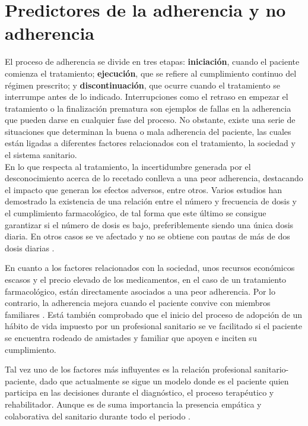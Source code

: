 \section{Predictores de la adherencia y no adherencia}

El proceso de adherencia se divide en tres etapas: \textbf{iniciación}, cuando el paciente comienza el tratamiento; \textbf{ejecución}, que se refiere al cumplimiento continuo del régimen prescrito; y \textbf{discontinuación}, que ocurre cuando el tratamiento se interrumpe antes de lo indicado. Interrupciones como el retraso en empezar el tratamiento o la finalización prematura son ejemplos de fallas en la adherencia que pueden darse en cualquier fase del proceso. No obstante, existe una serie de situaciones que determinan la buena o mala adherencia del paciente, las cuales están ligadas a diferentes factores relacionados con el tratamiento, la sociedad y el sistema sanitario.\\

En lo que respecta al tratamiento, la incertidumbre generada por el desconocimiento acerca de lo recetado conlleva a una peor adherencia, destacando el impacto que generan los efectos adversos, entre otros. Varios estudios han demostrado la existencia de una relación entre el número y frecuencia de dosis y el cumplimiento farmacológico, de tal forma que este último se consigue garantizar si el número de dosis es bajo, preferiblemente siendo una única dosis diaria. En otros casos se ve afectado y no se obtiene con pautas de más de dos dosis diarias \cite{Claxton2001}.

En cuanto a los factores relacionados con la sociedad, unos recursos económicos escasos y el precio elevado de los medicamentos, en el caso de un tratamiento farmacológico, están directamente asociados a una peor adherencia. Por lo contrario, la adherencia mejora cuando el paciente convive con miembros familiares \cite{libroblanco2021}. Está también comprobado que el inicio del proceso de adopción de un hábito de vida impuesto por un profesional sanitario se ve facilitado si el paciente se encuentra rodeado de amistades y familiar que apoyen e inciten su cumplimiento.

Tal vez uno de los factores más influyentes es la relación profesional sanitario-paciente, dado que actualmente se sigue un modelo donde es el paciente quien participa en las decisiones durante el diagnóstico, el proceso terapéutico y rehabilitador. Aunque es de suma importancia la presencia empática y colaborativa del sanitario durante todo el periodo \cite{libroblanco2021}.


